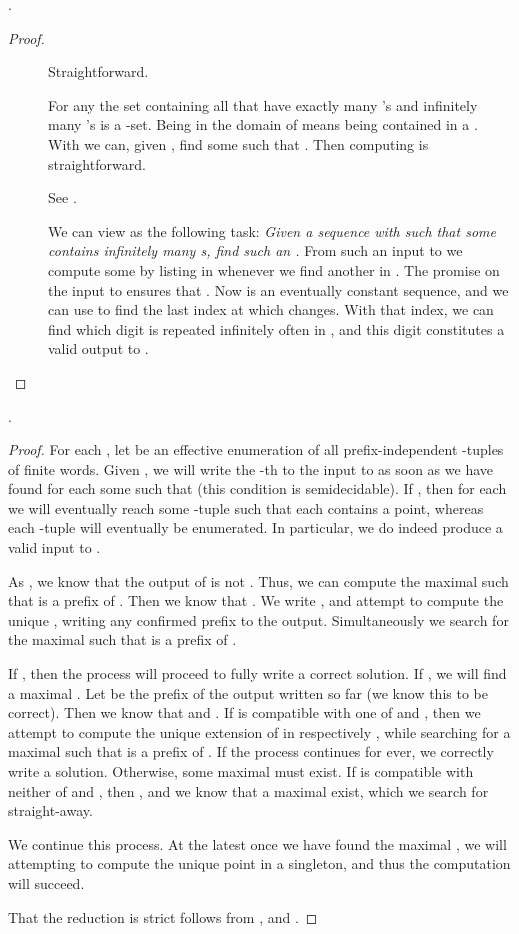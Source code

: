 \documentclass{eptcs-modified}
\begin{document}
\begin{proposition}
.
\begin{proof}
\begin{description}
\item[] Straightforward.
\item[] For any  the set  containing all  that have exactly  many 's and infinitely many 's is a -set. Being in the domain of  means being contained in a . With  we can, given , find some  such that . Then computing  is straightforward.
\item[] See \cite{paulybrattka5}.
\item[] We can view  as the following task: \emph{Given a sequence  with  such that some  contains infinitely many s, find such an .} From such an input to  we compute some  by listing  in  whenever we find another  in . The promise on the input to  ensures that . Now  is an eventually constant sequence, and we can use  to find the last index at which  changes. With that index, we can find which digit is repeated infinitely often in , and this digit constitutes a valid output to .
    \end{description}
\end{proof}
\end{proposition}

\begin{proposition}
.
\begin{proof}
For each , let  be an effective enumeration of all prefix-independent -tuples of finite words. Given , we will write the -th  to the input to  as soon as we have found for each  some  such that  (this condition is semidecidable). If , then for each  we will eventually reach some -tuple  such that each  contains a point, whereas each -tuple will eventually be enumerated. In particular, we do indeed produce a valid input to .

As , we know that the output  of  is not . Thus, we can compute the maximal  such that  is a prefix of . Then we know that . We write , and attempt to compute the unique , writing any confirmed prefix to the output. Simultaneously we search for the maximal  such that  is a prefix of .

If , then the process will proceed to fully write a correct solution. If , we will find a maximal . Let  be the prefix of the output written so far (we know this to be correct). Then we know that  and . If  is compatible with one of  and , then we attempt to compute the unique extension of  in  respectively , while searching for a maximal  such that  is a prefix of . If the process continues for ever, we correctly write a solution. Otherwise, some maximal  must exist. If  is compatible with neither of  and , then , and we know that a maximal  exist, which we search for straight-away.

We continue this process. At the latest once we have found the maximal , we will attempting to compute the unique point in a singleton, and thus the computation will succeed.

That the reduction is strict follows from ,  and .
\end{proof}
\end{proposition}
\end{document}

